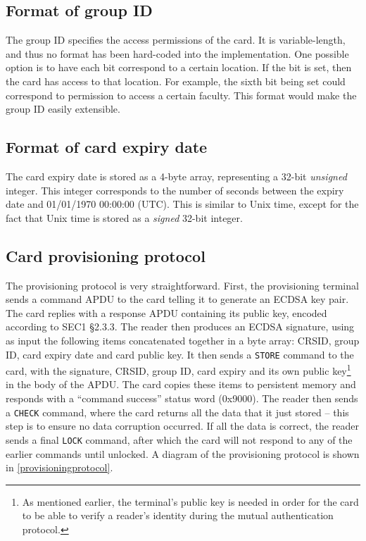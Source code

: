 \documentclass[12pt,a4paper,twoside,openright]{report}
\begin{document}
\subsection{Format of group ID}

The group ID specifies the access permissions of the card. It is variable-length, and thus no format has been hard-coded into the implementation. One possible option is to have each bit correspond to a certain location. If the bit is set, then the card has access to that location. For example, the sixth bit being set could correspond to permission to access a certain faculty. This format would make the group ID easily extensible.

\subsection{Format of card expiry date}

The card expiry date is stored as a 4-byte array, representing a 32-bit \emph{unsigned} integer. This integer corresponds to the number of seconds between the expiry date and 01/01/1970 00:00:00 (UTC). This is similar to Unix time, except for the fact that Unix time is stored as a \emph{signed} 32-bit integer.

\subsection{Card provisioning protocol}

The provisioning protocol is very straightforward. First, the provisioning terminal sends a command APDU to the card telling it to generate an ECDSA key pair. The card replies with a response APDU containing its public key, encoded according to SEC1 \cite{sec1} \S2.3.3. The reader then produces an ECDSA signature, using as input the following items concatenated together in a byte array: CRSID, group ID, card expiry date and card public key. It then sends a \texttt{STORE} command to the card, with the signature, CRSID, group ID, card expiry and its own public key\footnote{As mentioned earlier, the terminal's public key is needed in order for the card to be able to verify a reader's identity during the mutual authentication protocol.} in the body of the APDU. The card copies these items to persistent memory and responds with a ``command success'' status word (0x9000). The reader then sends a \texttt{CHECK} command, where the card returns all the data that it just stored -- this step is to ensure no data corruption occurred. If all the data is correct, the reader sends a final \texttt{LOCK} command, after which the card will not respond to any of the earlier commands until unlocked. A diagram of the provisioning protocol is shown in \autoref{provisioningprotocol}.
\end{document}
